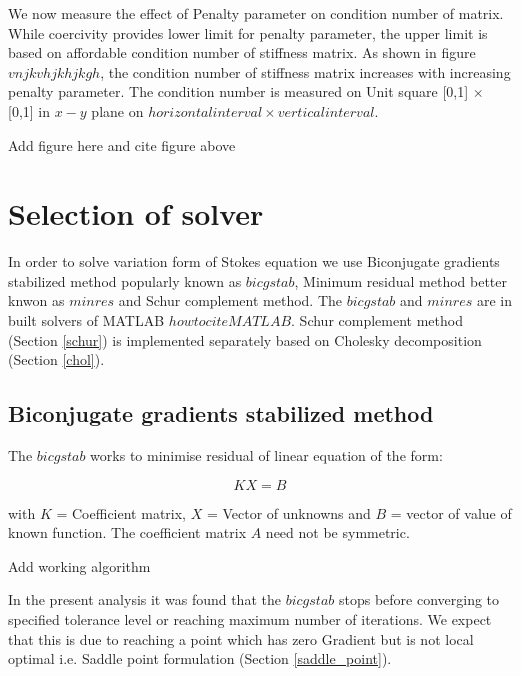\documentclass[a4paper,12pt]{book}
\begin{document}
We now measure the effect of Penalty parameter on condition number of matrix. While coercivity provides lower limit for penalty parameter, the upper limit is based on affordable condition number of stiffness matrix. As shown in figure $vnjkvhjkhjkgh$, the condition number of stiffness matrix increases with increasing penalty parameter.
The condition number is measured on Unit square [0,1] $\times$ [0,1] in $x-y$ plane on $horizontal interval \times vertical interval$.

\begin{Huge}
Add figure here and cite figure above
\end{Huge}

\section{Selection of solver}

In order to solve variation form of Stokes equation we use Biconjugate gradients stabilized method popularly known as $bicgstab$, Minimum residual method better knwon as $minres$ and Schur complement method. The $bicgstab$ and $minres$ are in built solvers of MATLAB $howtociteMATLAB$. Schur complement method (Section \ref{schur}) is implemented separately based on Cholesky decomposition (Section \ref{chol}).

\subsection{Biconjugate gradients stabilized method}

The $bicgstab$ works to minimise residual of linear equation of the form:

\begin{equation} \label{linear_matrix_equation}
KX = B
\end{equation}

with $K$ = Coefficient matrix, $X$ = Vector of unknowns and $B$ = vector of value of known function. The coefficient matrix $A$ need not be symmetric. 

\begin{Huge}
Add working algorithm
\end{Huge}

In the present analysis it was found that the $bicgstab$ stops before converging to specified tolerance level or reaching maximum number of iterations. We expect that this is due to reaching a point which has zero Gradient but is not local optimal i.e. Saddle point formulation (Section \ref{saddle_point}). 
\end{document}
